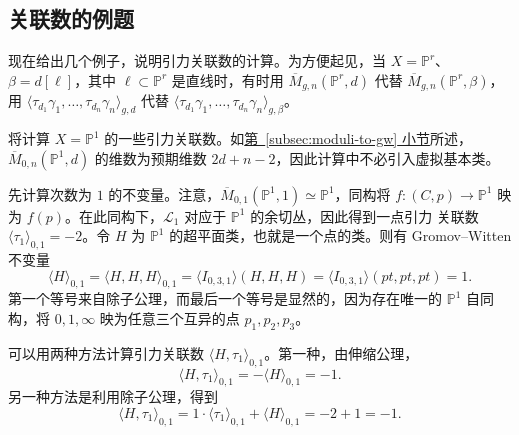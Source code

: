 \subsection{关联数的例题}\label{subsec:gravitational-correlator-examples}
现在给出几个例子，说明引力关联数的计算。为方便起见，当 $X=\mathbb P^r$、$\beta=d[\ell]$，其中 $\ell\subset\mathbb P^r$ 是直线时，有时用 $\overline M_{g,n}(\mathbb P^r,d)$ 代替 $\overline M_{g,n}(\mathbb P^r,\beta)$，用 $\langle\tau_{d_1}\gamma_1,\ldots,\tau_{d_n}\gamma_n\rangle_{g,d}$ 代替 $\langle\tau_{d_1}\gamma_1,\ldots,\tau_{d_n}\gamma_n\rangle_{g,\beta}$。
\begin{example}\label{ex:projective-line-gravitational}
将计算 $X=\mathbb P^1$ 的一些引力关联数。如\hyperref[subsec:moduli-to-gw]{第~\ref*{subsec:moduli-to-gw} 小节}所述，$\overline M_{0,n}(\mathbb P^1,d)$ 的维数为预期维数 $2d+n-2$，因此计算中不必引入虚拟基本类。

先计算次数为 $1$ 的不变量。注意，$\overline M_{0,1}(\mathbb P^1,1)\simeq\mathbb P^1$，同构将 $f:(C,p)\to\mathbb P^1$ 映为 $f(p)$。在此同构下，$\mathcal L_1$ 对应于 $\mathbb P^1$ 的余切丛，因此得到一点引力
关联数 $\langle\tau_1\rangle_{0,1}=-2$。令 $H$ 为 $\mathbb P^1$ 的超平面类，也就是一个点的类。则有 Gromov--Witten 不变量
\[
\langle H\rangle_{0,1}=\langle H,H,H\rangle_{0,1}
=\langle I_{0,3,1}\rangle(H,H,H)
=\langle I_{0,3,1}\rangle(pt,pt,pt)=1.
\]
第一个等号来自除子公理，而最后一个等号是显然的，因为存在唯一的 $\mathbb P^1$ 自同构，将 $0,1,\infty$ 映为任意三个互异的点 $p_1,p_2,p_3$。

可以用两种方法计算引力关联数 $\langle H,\tau_1\rangle_{0,1}$。第一种，由伸缩公理，
\[
\langle H,\tau_1\rangle_{0,1}=-\langle H\rangle_{0,1}=-1.
\]
另一种方法是利用除子公理，得到
\[
\langle H,\tau_1\rangle_{0,1}
=1\cdot\langle\tau_1\rangle_{0,1}+\langle H\rangle_{0,1}=-2+1=-1.
\]


\end{example}
